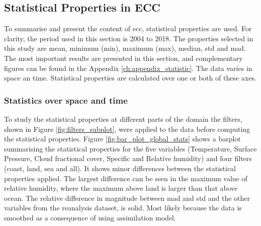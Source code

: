 \subsection{Statistical Properties in ECC}
To summarise and present the content of \acrshort{ecc}, statistical properties are used. For clarity, the period used in this section is 2004 to 2018. The properties selected in this study are mean, minimum (min), maximum (max), median, \acrfull{std} and \acrfull{mad}. The most important results are presented in this section, and complementary figures can be found in the Appendix \ref{ch:appendix_statistic}. 
The data varies in space an time. Statistical properties are calculated over one or both of these axes.

\subsubsection{Statistics over space and time}
To study the statistical properties at different parts of the domain the filters, shown in Figure \ref{fig:filters_subplot}, were applied to the data before computing the statistical properties. Figure \ref{fig:bar_plot_global_stats} shows a barplot summarising the statistical properties for the five variables (Temperature, Surface Pressure, Cloud fractional cover, Specific and Relative humidity) and four filters (coast, land, sea and all). It shows minor differences between the statistical properties applied. The largest difference can be seen in the maximum value of relative humidity, where the maximum above land is larger than that above ocean. The relative difference in magnitude between \acrshort{mad} and \acrshort{std} and the other variables from the reanalysis dataset, is solid. Most likely because the data is smoothed as a consequence of using assimilation model. 
